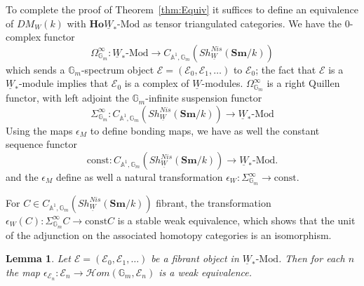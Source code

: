 \documentclass[a4paper,12pt,draft]{amsart}
\newtheorem{lemma}{Lemma}
\theoremstyle{definition}
\theoremstyle{remark}
\begin{document}
To complete the proof of Theorem~\ref{thm:Equiv} it suffices to define an equivalence of $DM_W(k)$ with ${{\mathbf{Ho}}} \underline{W}_*\text{-Mod}$ as tensor triangulated categories. We have the 0-complex functor
\[
\Omega^\infty_{{{\mathbb G}}_m}:  \underline{W}_*\text{-Mod}\to  C_{{{\mathbb A}}^1,{{\mathbb G}}_m}(Sh^{Nis}_{\underline{W}}({{\mathbf{Sm}}}/k))
\]
which sends a ${{\mathbb G}}_m$-spectrum object ${{\mathcal E}}=({{\mathcal E}}_0, {{\mathcal E}}_1,\ldots)$ to ${{\mathcal E}}_0$; the fact that ${{\mathcal E}}$ is a $\underline{W}_{*}$-module implies that ${{\mathcal E}}_0$ is a complex of $\underline{W}$-modules. $\Omega^\infty_{{{\mathbb G}}_m}$ is a right Quillen functor, with left adjoint the ${{\mathbb G}}_m$-infinite suspension functor
\[
\Sigma^\infty_{{{\mathbb G}}_m}:  C_{{{\mathbb A}}^1,{{\mathbb G}}_m}(Sh^{Nis}_{\underline{W}}({{\mathbf{Sm}}}/k))\to  \underline{W}_{*}\text{-Mod}
\]
Using the maps $\epsilon_M$ to define bonding maps, we have as well the constant sequence functor
\[
\text{const}: C_{{{\mathbb A}}^1,{{\mathbb G}}_m}(Sh^{Nis}_{\underline{W}}({{\mathbf{Sm}}}/k))\to  \underline{W}_{*}\text{-Mod}.
\]
and the $\epsilon_M$ define as well a natural transformation $\epsilon_W:\Sigma^\infty_{{{\mathbb G}}_m}\to \text{const}$.

For $C\in C_{{{\mathbb A}}^1,{{\mathbb G}}_m}(Sh^{Nis}_{\underline{W}}({{\mathbf{Sm}}}/k))$ fibrant, the transformation $\epsilon_W(C):\Sigma^\infty_{{{\mathbb G}}_m}C\to \text{const}C$ is a stable weak equivalence, which shows that the unit of the adjunction on the associated homotopy categories is an isomorphism. 

\begin{lemma} Let ${{\mathcal E}}=({{\mathcal E}}_0, {{\mathcal E}}_1,\ldots)$ be a fibrant object in $\underline{W}_{*}\text{-Mod}$. Then for each $n$ the map $\epsilon_{{{\mathcal E}}_n}:{{\mathcal E}}_n\to {{\mathcal{H}{om}}}({{\mathbb G}}_m, {{\mathcal E}}_n)$ is a weak equivalence.
\end{lemma}
\end{document}
